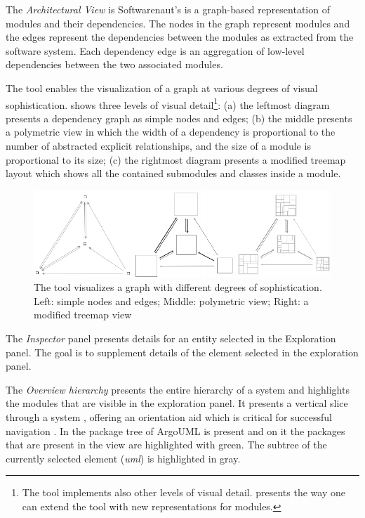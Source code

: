 \documentclass[preprint,12pt]{elsarticle}
\newcommand{\cd}[1]{{\em{#1}}}
\begin{document}
\begin{description}
\item The {\em Architectural View} is Softwarenaut's is a graph-based representation of modules and their dependencies. The nodes in the graph represent modules and the edges represent the dependencies between the modules as extracted from the software system. Each dependency edge is an aggregation of low-level dependencies between the two associated modules. 

The tool enables the visualization of a graph at various degrees of visual sophistication.  shows three levels of visual detail\footnote{The tool implements also other levels of visual detail.  presents the way one can extend the tool with new representations for modules.}: (a) the leftmost diagram presents a dependency graph as simple nodes and edges; (b) the middle presents a polymetric view \cite{lanza-pv} in which the width of a dependency is proportional to the number of abstracted explicit relationships, and the size of a module is proportional to its size; (c) the rightmost diagram presents a modified treemap layout which shows all the contained submodules and classes inside a module. 

\begin{figure}[h]
\begin{center}
\includegraphics[width=1.04\linewidth]{images/sofistication}
\caption{The tool visualizes a graph with different degrees of sophistication. Left: simple nodes and edges; Middle: polymetric view; Right: a modified treemap view}

\end{center}
\end{figure}

\item The {\em Inspector} panel presents details for an entity selected in the Exploration panel. The goal is to supplement details of the element selected in the exploration panel. %

\item The {\em Overview hierarchy} presents the entire hierarchy of a system and highlights the modules that are visible in the exploration panel. It presents a vertical slice through a system \cite{wong-thesis}, offering an orientation aid which is critical for successful navigation \cite{storey-awareness}. In  the package tree of ArgoUML is present and on it the packages that are present in the view are highlighted with green. The subtree of the currently selected element (\cd{uml}) is highlighted in gray. 

\end{description}
\end{document}
